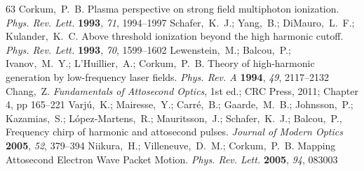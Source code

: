 \documentclass[journal=jacsat,manuscript=article]{achemso}
\begin{document}
\begin{mcitethebibliography}{63}
\mciteSetBstMidEndSepPunct{\mcitedefaultmidpunct}
{\mcitedefaultendpunct}{\mcitedefaultseppunct}\relax
\EndOfBibitem
{}
Corkum,~P.~B. Plasma perspective on strong field multiphoton ionization.
  \emph{Phys. Rev. Lett.} \textbf{1993}, \emph{71}, 1994--1997\relax
\mciteBstWouldAddEndPuncttrue
\mciteSetBstMidEndSepPunct{\mcitedefaultmidpunct}
{\mcitedefaultendpunct}{\mcitedefaultseppunct}\relax
\EndOfBibitem
{}
Schafer,~K.~J.; Yang,~B.; DiMauro,~L.~F.; Kulander,~K.~C. Above threshold
  ionization beyond the high harmonic cutoff. \emph{Phys. Rev. Lett.}
  \textbf{1993}, \emph{70}, 1599--1602\relax
\mciteBstWouldAddEndPuncttrue
\mciteSetBstMidEndSepPunct{\mcitedefaultmidpunct}
{\mcitedefaultendpunct}{\mcitedefaultseppunct}\relax
\EndOfBibitem
{}
Lewenstein,~M.; Balcou,~P.; Ivanov,~M.~Y.; L'Huillier,~A.; Corkum,~P.~B. Theory
  of high-harmonic generation by low-frequency laser fields. \emph{Phys. Rev.
  A} \textbf{1994}, \emph{49}, 2117--2132\relax
\mciteBstWouldAddEndPuncttrue
\mciteSetBstMidEndSepPunct{\mcitedefaultmidpunct}
{\mcitedefaultendpunct}{\mcitedefaultseppunct}\relax
\EndOfBibitem
{}
Chang,~Z. \emph{Fundamentals of Attosecond Optics}, 1st ed.; CRC Press, 2011;
  Chapter 4, pp 165--221\relax
\mciteBstWouldAddEndPuncttrue
\mciteSetBstMidEndSepPunct{\mcitedefaultmidpunct}
{\mcitedefaultendpunct}{\mcitedefaultseppunct}\relax
\EndOfBibitem
{}
Varj\'{u},~K.; Mairesse,~Y.; Carr\'{e},~B.; Gaarde,~M.~B.; Johnsson,~P.;
  Kazamias,~S.; L\'{o}pez-Martens,~R.; Mauritsson,~J.; Schafer,~K.~J.;
  Balcou,~P.,   Frequency chirp of harmonic and attosecond
  pulses. \emph{Journal of Modern Optics} \textbf{2005}, \emph{52},
  379--394\relax
\mciteBstWouldAddEndPuncttrue
\mciteSetBstMidEndSepPunct{\mcitedefaultmidpunct}
{\mcitedefaultendpunct}{\mcitedefaultseppunct}\relax
\EndOfBibitem
{}
Niikura,~H.; Villeneuve,~D.~M.; Corkum,~P.~B. Mapping Attosecond Electron Wave
  Packet Motion. \emph{Phys. Rev. Lett.} \textbf{2005}, \emph{94}, 083003\relax
\mciteBstWouldAddEndPuncttrue
\mciteSetBstMidEndSepPunct{\mcitedefaultmidpunct}
{\mcitedefaultendpunct}{\mcitedefaultseppunct}\relax

\end{mcitethebibliography}
\end{document}
